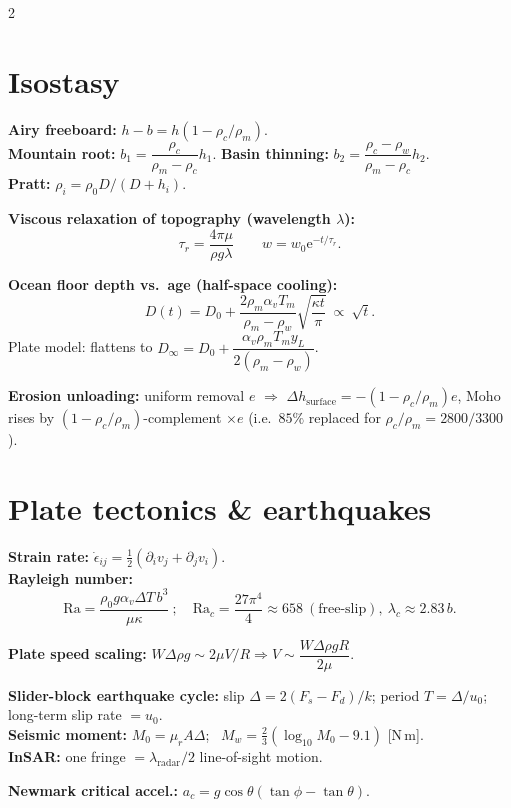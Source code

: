 \documentclass[9pt,a4paper]{extarticle}
\newcommand{\ee}{\mathrm{e}}
\begin{document}
\begin{multicols}{2}
\section{Isostasy}
\begin{eqbox}
\textbf{Airy freeboard:} $h-b=h(1-\rho_c/\rho_m)$.\\
\textbf{Mountain root:} $b_1=\dfrac{\rho_c}{\rho_m-\rho_c}h_1$.\quad
\textbf{Basin thinning:} $b_2=\dfrac{\rho_c-\rho_w}{\rho_m-\rho_c}h_2$.\\
\textbf{Pratt:} $\rho_i=\rho_0D/(D+h_i)$.
\end{eqbox}
\begin{eqbox}
\textbf{Viscous relaxation of topography (wavelength $\lambda$):}
\[
\boxed{\tau_r=\dfrac{4\pi\mu}{\rho g\lambda}}\qquad w=w_0\ee^{-t/\tau_r}.
\]
\end{eqbox}
\begin{eqbox}
\textbf{Ocean floor depth vs.\ age (half-space cooling):}
\[
D(t)=D_0+\frac{2\rho_m\alpha_vT_m}{\rho_m-\rho_w}\sqrt{\frac{\kappa t}\pi}\ \propto\ \sqrt t.
\]
Plate model: flattens to $D_\infty=D_0+\dfrac{\alpha_v\rho_mT_my_L}{2(\rho_m-\rho_w)}$.
\end{eqbox}
\begin{eqbox}
\textbf{Erosion unloading:} uniform removal $e$ $\Rightarrow$ $\Delta h_\mathrm{surface}=-(1-\rho_c/\rho_m)e$, Moho rises by $(1-\rho_c/\rho_m)$-complement $\times e$ (i.e.\ $85\%$ replaced for $\rho_c/\rho_m=2800/3300$).
\end{eqbox}

\section{Plate tectonics \& earthquakes}
\begin{eqbox}
\textbf{Strain rate:} $\dot\epsilon_{ij}=\tfrac12(\partial_iv_j+\partial_jv_i)$.\\
\textbf{Rayleigh number:}
\[
\mathrm{Ra}=\dfrac{\rho_0g\alpha_v\Delta T\,b^3}{\mu\kappa}\ ;\quad \mathrm{Ra}_c=\dfrac{27\pi^4}{4}\approx658\ (\text{free-slip}),\ \lambda_c\approx2.83\,b.
\]
\end{eqbox}
\begin{eqbox}
\textbf{Plate speed scaling:} $W\Delta\rho g\sim 2\mu V/R\Rightarrow V\sim\dfrac{W\Delta\rho g R}{2\mu}$.
\end{eqbox}
\begin{eqbox}
\textbf{Slider-block earthquake cycle:} slip $\Delta=2(F_s-F_d)/k$; period $T=\Delta/u_0$; long-term slip rate $=u_0$.\\
\textbf{Seismic moment:} $M_0=\mu_rA\Delta$; \ $M_w=\tfrac23(\log_{10}M_0-9.1)$ [N\,m].\\
\textbf{InSAR:} one fringe $=\lambda_\mathrm{radar}/2$ line-of-sight motion.
\end{eqbox}
\begin{eqbox}
\textbf{Newmark critical accel.:} $a_c=g\cos\theta(\tan\phi-\tan\theta)$.
\end{eqbox}


\end{multicols}
\end{document}
